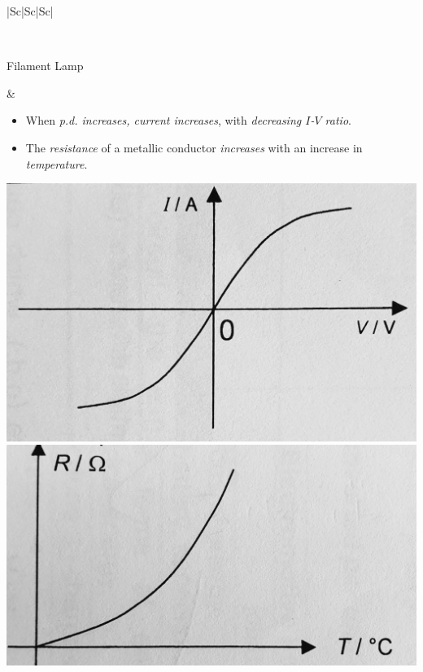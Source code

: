 \documentclass[oneside]{book}
\begin{document}
\begin{itemize}
\begin{longtable}{|Sc|Sc|Sc|}
\begin{minipage}{0.3\textwidth}
\begin{itemize}
            \end{itemize}
        \end{minipage}\\
        \hline
        \begin{minipage}{0.25\textwidth}
            Filament Lamp
        \end{minipage} &  
        \begin{minipage}{0.3\textwidth}
            \begin{itemize}
                \item When \emph{p.d. increases, current increases}, with \emph{decreasing \(I\)-\(V\) ratio}.
                \item The \emph{resistance} of a metallic conductor \emph{increases} with an increase in \emph{temperature}.
            \end{itemize} 
            \includegraphics[width=\textwidth]{../images/Filament Lamp I-V Characteristics.jpg}\\[-1mm]
            \includegraphics[width=\textwidth]{../images/Filament Lamp Resistance.jpg}

\end{minipage}
\end{longtable}
\end{itemize}
\end{document}

